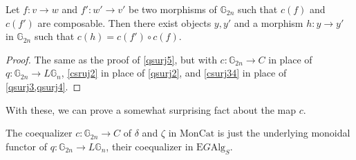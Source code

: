 \begin{prop} \label{csurj5} Let $f: v \to w$ and $f' : w' \to v'$ be two morphisms of $\mathbb{G}_{2n}$ such that $c(f)$ and $c(f')$ are composable. Then there exist objects $y, y'$ and a morphism $h: y \to y'$ in $\mathbb{G}_{2n}$ such that $c(h) = c(f') \circ c(f)$.
\end{prop}
\begin{proof}
The same as the proof of \cref{qsurj5}, but with $c: \mathbb{G}_{2n} \to C$ in place of $q: \mathbb{G}_{2n} \to L\mathbb{G}_n$, \cref{csruj2} in place of \cref{qsurj2}, and \cref{csurj34} in place of \cref{qsurj3,qsurj4}.
\end{proof}

With these, we can prove a somewhat surprising fact about the map $c$.

\begin{prop} \label{c=q} The coequalizer $c: \mathbb{G}_{2n} \to C$ of $\delta$ and $\zeta$ in $\mathrm{MonCat}$ is just the underlying monoidal functor of $q: \mathbb{G}_{2n} \to L\mathbb{G}_n$, their coequalizer in $\mathrm{E}G\mathrm{Alg}_S$.
\end{prop}

